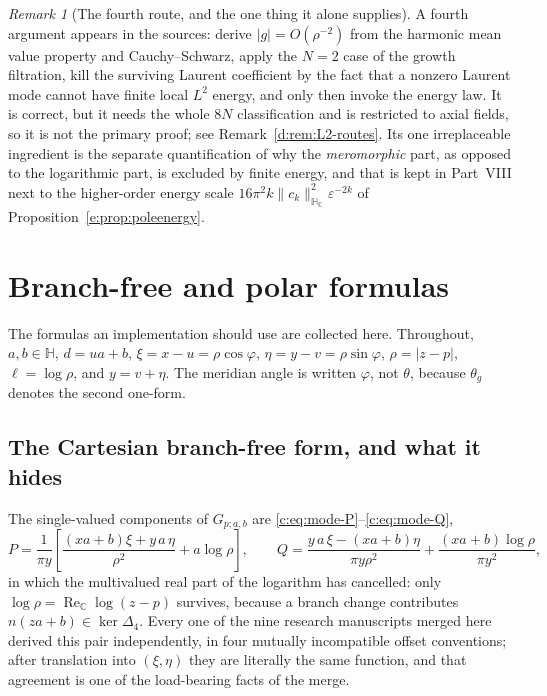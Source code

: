 \documentclass[11pt,a4paper]{article}
\numberwithin{equation}{section}
\theoremstyle{definition}
\theoremstyle{remark}
\newtheorem{remark}[theorem]{Remark}
\theoremstyle{plain}
\newcommand{\HH}{\mathbb H}
\newcommand{\HC}{\mathbb H_{\mathbb C}}
\newcommand{\CC}{\mathbb C}
\DeclareMathOperator{\Rea}{Re}
\newcommand{\ReC}{\Rea_{\CC}}
\newcommand{\lap}{\Delta_4}
\newcommand{\thet}{\theta}
\newcommand{\abs}[1]{\lvert #1\rvert}
\newcommand{\norm}[1]{\lVert #1\rVert}
\begin{document}
\begin{remark}[The fourth route, and the one thing it alone supplies]
A fourth argument appears in the sources: derive $\abs g=O(\rho^{-2})$ from
the harmonic mean value property and Cauchy--Schwarz, apply the $N=2$ case
of the growth filtration, kill the surviving Laurent coefficient by the
fact that a nonzero Laurent mode cannot have finite local $L^2$ energy, and
only then invoke the energy law. It is correct, but it needs the whole $8N$
classification and is restricted to axial fields, so it is not the primary
proof; see Remark~\ref{d:rem:L2-routes}. Its one irreplaceable ingredient
is the separate quantification of why the \emph{meromorphic} part, as
opposed to the logarithmic part, is excluded by finite energy, and that is
kept in Part~VIII next to the higher-order energy scale
$16\pi^2k\norm{c_k}_{\HC}^2\varepsilon^{-2k}$ of
Proposition~\ref{e:prop:poleenergy}.
\end{remark}

\section{Branch-free and polar formulas}
\label{f:app:formulas}

The formulas an implementation should use are collected here. Throughout,
$a,b\in\HH$, $d=ua+b$, $\xi=x-u=\rho\cos\varphi$,
$\eta=y-v=\rho\sin\varphi$, $\rho=\abs{z-p}$, $\ell=\log\rho$, and
$y=v+\eta$. The meridian angle is written $\varphi$, not $\theta$, because
$\thet_g$ denotes the second one-form.

\subsection{The Cartesian branch-free form, and what it hides}

The single-valued components of $G_{p;a,b}$ are
\eqref{c:eq:mode-P}--\eqref{c:eq:mode-Q},
\[
 P=\frac{1}{\pi y}\left[\frac{(xa+b)\xi+y\,a\,\eta}{\rho^{2}}
   +a\log\rho\right],
 \qquad
 Q=\frac{y\,a\,\xi-(xa+b)\eta}{\pi y\rho^{2}}
   +\frac{(xa+b)\log\rho}{\pi y^{2}},
\]
in which the multivalued real part of the logarithm has cancelled: only
$\log\rho=\ReC\log(z-p)$ survives, because a branch change contributes
$n(za+b)\in\ker\lap$. Every one of the nine research manuscripts merged
here derived this pair independently, in four mutually incompatible offset
conventions; after translation into $(\xi,\eta)$ they are literally the
same function, and that agreement is one of the load-bearing facts of the
merge.
\end{document}
